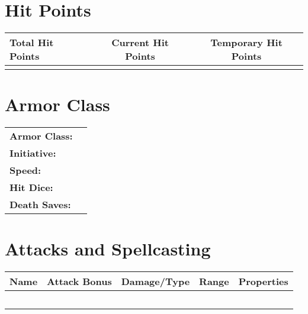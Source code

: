 \documentclass[12pt]{article}
\begin{document}
\section{Hit Points}
\begin{tabularx}{\linewidth}{lcc}
\toprule
\textbf{Total Hit Points} & \textbf{Current Hit Points} & \textbf{Temporary Hit Points} \\
\midrule
 &  &  \\
\bottomrule
\end{tabularx}

\section{Armor Class}
\begin{tabularx}{\linewidth}{lX}
\textbf{Armor Class:} & \\
\textbf{Initiative:} & \\
\textbf{Speed:} & \\
\textbf{Hit Dice:} & \\
\textbf{Death Saves:} & \\
\end{tabularx}

\section{Attacks and Spellcasting}
\begin{tabularx}{\linewidth}{lcccc}
\toprule
\textbf{Name} & \textbf{Attack Bonus} & \textbf{Damage/Type} & \textbf{Range} & \textbf{Properties} \\
\midrule
 &  &  &  &  \\
 &  &  &  &  \\
 &  &  &  &  \\
 &  &  &  &  \\
 &  &  &  &  \\
\bottomrule
\end{tabularx}
\end{document}
